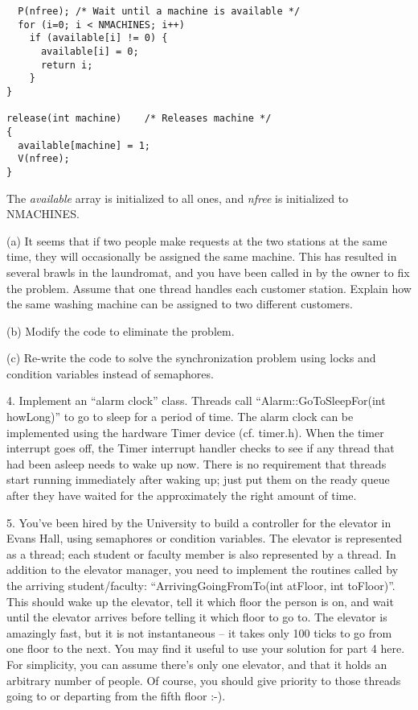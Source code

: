 \begin{description}
\begin{verbatim}
  P(nfree);	/* Wait until a machine is available */
  for (i=0; i < NMACHINES; i++)
    if (available[i] != 0) {
      available[i] = 0;
      return i;
    }
}

release(int machine)	/* Releases machine */
{
  available[machine] = 1;
  V(nfree);
}
\end{verbatim}

The {\em available} array is initialized to all ones, and {\em nfree} is
initialized to NMACHINES.

\begin{description}

\item{(a)} It seems that
if two people make requests at the two stations at the same time, they
will occasionally be assigned the same machine.  This has resulted in
several brawls in the laundromat, and you have been called in by the
owner to fix the problem.  Assume that one thread handles each
customer station.  Explain how the same washing machine can be assigned
to two different customers.

\item{(b)} Modify the code to eliminate the problem.

\item{(c)} Re-write the code to solve the synchronization problem
using locks and condition variables instead of semaphores.

\end{description}

\item{4.} Implement an ``alarm clock'' class.
Threads call ``Alarm::GoToSleepFor(int howLong)'' to go to sleep for
a period of time.  The alarm clock can be implemented using the hardware
Timer device (cf. timer.h). When the timer interrupt goes off, the
Timer interrupt
handler checks to see if any thread that had been asleep needs to wake up now.
There is no requirement that threads start running immediately after
waking up; just put them on the ready queue after they have waited for
the approximately the right amount of time.

\item{5.} You've been hired by the University to build a controller
for the elevator in Evans Hall, using semaphores or condition variables.
The elevator is represented as a thread; each student or faculty member
is also represented by a thread.   In addition to the elevator manager,
you need to implement the routines called by the arriving student/faculty:
``ArrivingGoingFromTo(int atFloor, int toFloor)''.   This should wake
up the elevator, tell it which floor the person is on, and wait until
the elevator arrives before telling it which floor to go to.
The elevator is amazingly fast, but it is not instantaneous -- it takes
only 100 ticks to go from one floor to the next.   You may find it useful
to use your solution for part 4 here.  For simplicity, you can assume
there's only one elevator, and that it holds an arbitrary number of people.
Of course, you should give priority to those threads
going to or departing from the fifth floor :-).


\end{description}
